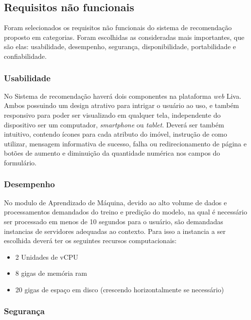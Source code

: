 \subsection{Requisitos não funcionais}

Foram selecionados os requisitos não funcionais do sistema de recomendação proposto em categorias. Foram escolhidas as consideradas mais importantes, que são elas: usabilidade, desempenho, segurança, disponibilidade, portabilidade e confiabilidade.

\subsubsection{Usabilidade}

No Sistema de recomendação haverá dois componentes na plataforma \textit{web} Liva. Ambos possuindo um design atrativo para intrigar o usuário ao uso, e também responsivo para poder ser visualizado em qualquer tela, independente do dispositivo ser um computador, \textit{smartphone} ou \textit{tablet}. Deverá ser também intuitivo, contendo ícones para cada atributo do imóvel, instrução de como utilizar, mensagem informativa de sucesso, falha ou redirecionamento de página e botões de aumento e diminuição da quantidade numérica nos campos do formulário.

\subsubsection{Desempenho}
\label{desempenho}

No modulo de Aprendizado de Máquina, devido ao alto volume de dados e processamentos demandados do treino e predição do modelo, na qual é necessário ser processado em menos de 10 segundos para o usuário, são demandadas instancias de servidores adequadas ao contexto. Para isso a instancia a ser escolhida deverá ter os seguintes recursos computacionais:

\begin{itemize}
    \item 2 Unidades de vCPU
    \item 8 gigas de memória ram
    \item 20 gigas de espaço em disco (crescendo horizontalmente se necessário)
\end{itemize}

\subsubsection{Segurança}

